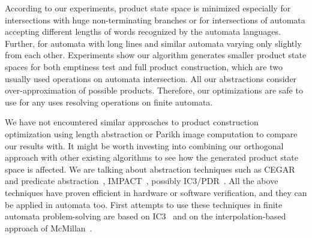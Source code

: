 According to our experiments, product state space is minimized especially for intersections with huge non-terminating branches or for intersections of automata accepting different lengths of words recognized by the automata languages. Further, for automata with long lines and similar automata varying only slightly from each other. Experiments show our algorithm generates smaller product state spaces for both emptiness test and full product construction, which are two usually used operations on automata intersection. All our abstractions consider over-approximation of possible products. Therefore, our optimizations are safe to use for any uses resolving operations on finite automata.

We have not encountered similar approaches to product construction optimization using length abstraction or Parikh image computation to compare our results with. It might be worth investing into combining our orthogonal approach with other existing algorithms to see how the generated product state space is affected. We are talking about abstraction techniques such as CEGAR~\cite{DBLP:conf/cav/ClarkeGJLV00} and predicate abstraction~\cite{DBLP:conf/cav/ColonU98, DBLP:conf/cav/GrafS97}, IMPACT~\cite{DBLP:conf/cav/McMillan06}, possibly IC3/PDR~\cite{DBLP:conf/sat/HoderB12, DBLP:conf/fmcad/BradleyM07}. All the above techniques have proven efficient in hardware or software verification, and they can be applied in automata too. First attempts to use these techniques in finite automata problem-solving are based on IC3~\cite{DBLP:journals/pacmpl/HolikJLRV18, DBLP:conf/cav/WangTLYJ16, DBLP:journals/corr/abs-1708-09073} and on the interpolation-based approach of McMillan~\cite{DBLP:conf/tacas/AmlaM07, DBLP:conf/tacas/GangeNSSS13}.
